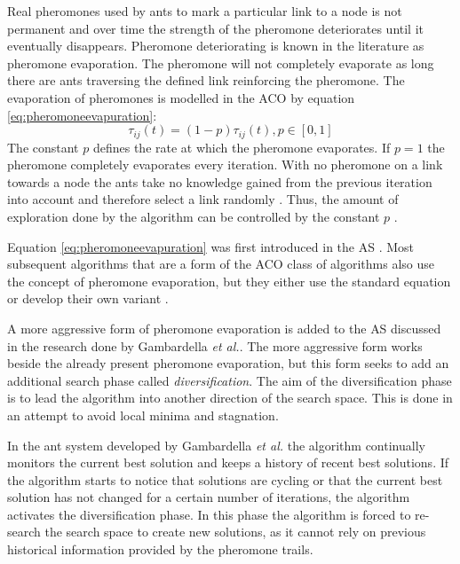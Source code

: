 Real pheromones used by ants to mark a particular link to a node is not permanent and over time the strength of the pheromone deteriorates until it eventually disappears\cite{CompuIntelligenceIntro}. Pheromone deteriorating is known in the literature as pheromone evaporation\cite{CompuIntelligenceIntro}. The pheromone will not completely evaporate as long there are ants traversing the defined link reinforcing the pheromone. The evaporation of pheromones is modelled in the \gls{ACO} by equation \ref{eq:pheromoneevapuration}\cite{AntIntroTrends,AntSurvey}:
\begin{equation}
\label{eq:pheromoneevapuration}
	\tau_{ij}(t) = (1-p)\tau_{ij}(t), p\in [0,1]
\end{equation}
The constant $p$ defines the rate at which the pheromone evaporates. If $p=1$ the pheromone completely evaporates every iteration. With no pheromone on a link towards a node the ants take no knowledge gained from the previous iteration into account and therefore select a link randomly \cite{CompuIntelligenceIntro,AntsAndStigmergy}. Thus, the amount of exploration done by the algorithm can be controlled by the constant $p$ \cite{CompuIntelligenceIntro,AntsAndStigmergy}.

Equation \ref{eq:pheromoneevapuration} was first introduced in the \gls{AS} \cite{CompuIntelligenceIntro,AntSurvey}. Most subsequent algorithms that are a form of the \gls{ACO} class of algorithms also use the concept of pheromone evaporation, but they either use the standard equation or develop their own variant \cite{CompuIntelligenceIntro,AntsAndStigmergy}.

A more aggressive form of pheromone evaporation  is added to the \gls{AS} discussed in the research done by Gambardella \emph{et al.}\cite{AntQAP}. The more aggressive form works beside the already present pheromone evaporation, but this form seeks to add an additional search phase called \emph{diversification}\cite{AntQAP}. The aim of the diversification phase is to lead the algorithm into another direction of the search space\cite{AntQAP}. This is done in an attempt to avoid local minima and stagnation\cite{AntQAP}.

In the ant system developed by Gambardella \emph{et al.} the algorithm continually monitors the current best solution and keeps a history of recent best solutions\cite{AntQAP}. If the algorithm starts to notice that solutions are cycling or that the current best solution has not changed for a certain number of iterations, the algorithm activates the diversification phase\cite{AntQAP}. In this phase the algorithm is forced to re-search the search space to create new solutions, as it cannot rely on previous historical information provided by the pheromone trails\cite{AntQAP}.

